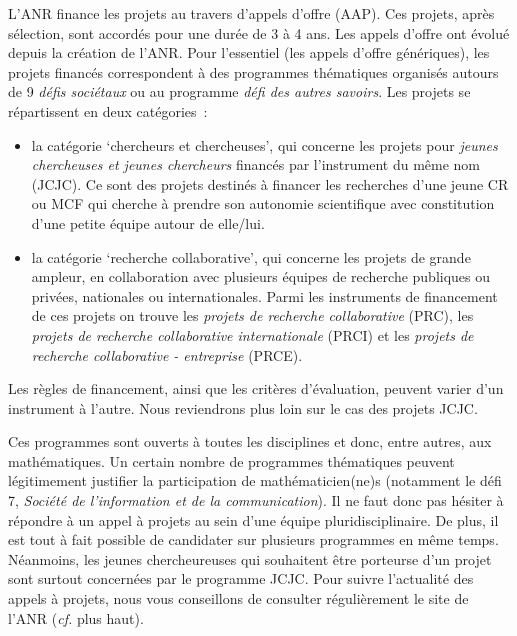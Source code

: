 L'ANR finance les projets au travers d'appels d'offre (AAP). Ces projets, apr\`es s\'election, sont accord\'es pour une dur\'ee de 3 {\`a} 4 ans. Les appels d'offre ont \'evolu\'e depuis la cr\'eation de l'ANR. Pour l'essentiel (les appels d'offre g\'en\'eriques), les projets financ\'es correspondent \`a des programmes th\'ematiques organis\'es autours de 9 {\em d\'efis soci\'etaux} ou au programme {\em d\'efi des autres savoirs}. Les projets se r\'epartissent en deux cat\'egories~:
\begin{itemize}
\item la cat\'egorie `chercheurs et chercheuses', qui concerne les projets pour {\em jeunes chercheuses et jeunes chercheurs} financ\'es par l'instrument du m\^eme nom (JCJC). Ce sont des projets destin\'es \`a financer les recherches d'un\mp e jeune CR ou MCF qui cherche {\`a} prendre son autonomie scientifique avec constitution d'une petite {\'e}quipe autour de elle/lui.
\item la cat\'egorie `recherche collaborative', qui concerne les projets de grande ampleur, en collaboration avec plusieurs \'equipes de recherche publiques ou priv\'ees, nationales ou internationales. Parmi les instruments de financement de ces projets on trouve les {\em projets de recherche collaborative} (PRC), les {\em projets de recherche collaborative internationale} (PRCI) et les {\em projets de recherche collaborative - entreprise} (PRCE).
\end{itemize}

Les r\`egles de financement, ainsi que les crit\`eres
d'\'evaluation, peuvent varier d'un instrument \`a l'autre. Nous reviendrons plus loin sur le cas des projets JCJC.

Ces programmes sont ouverts \`a toutes les disciplines et donc, entre autres,
aux math\'ematiques. Un certain nombre de programmes th\'ematiques
peuvent l\'egitimement justifier la participation de math\'ematicien(ne)s (notamment le d\'efi 7, {\em Soci\'et\'e de l'information et de la communication}).
Il ne faut donc pas h\'esiter \`a r\'epondre
\`a un appel \` a projets au sein d'une \'equipe pluridisciplinaire. De plus, il est tout \`a
fait possible de candidater sur plusieurs programmes en m\^eme temps.
N\'eanmoins, les jeunes chercheur\mp euse\mp s qui souhaitent \^etre porteur\mp se d'un projet sont surtout concern\'e\mp e\mp s par le programme JCJC.
Pour suivre l'actualit\'e des appels \`a projets, nous vous conseillons de
consulter r\'eguli\`erement le site de l'ANR ({\em cf.} plus haut).
\\

